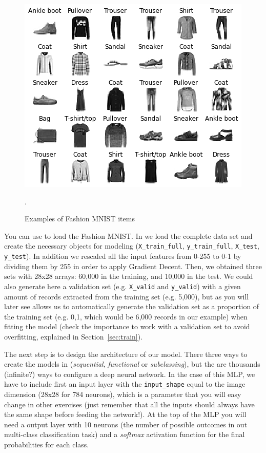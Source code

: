 \begin{figure}
\centering
\includegraphics[width=0.9\linewidth]{figures/ch15_fashion.png}
\caption{Examples of Fashion MNIST items}.
\label{fig:fashion}
\end{figure}

You can use  to load the Fashion MNIST. In  we load the complete data set and create the necessary objects for modeling (\texttt{X\_train\_full}, \texttt{y\_train\_full}, \texttt{X\_test}, \texttt{y\_test}). In addition we rescaled all the input features from 0-255 to 0-1 by dividing them by 255 in order to apply Gradient Decent. Then, we obtained three sets with 28x28 arrays: 60,000 in the training, and 10,000 in the test. We could also generate here a validation set (e.g. \texttt{X\_valid} and \texttt{y\_valid}) with a given amount of records extracted from the training set (e.g. 5,000), but as you will later see   allows us to automatically generate the validation set as a proportion of the training set (e.g. 0,1, which would be 6,000 records in our example) when fitting the model (check the importance to work with a validation set to avoid overfitting, explained in Section~\ref{sec:train}).


The next step is to design the architecture of our model. There three ways to create the models in  (\textit{sequential}, \textit{functional} or \textit{subclassing}), but the are thousands (infinite?) ways to configure a deep neural network. In the case of this MLP, we have to include first an input layer with the \texttt{input\_shape} equal to the image dimension (28x28 for 784 neurons), which is a parameter that you will easy change in other exercises (just remember that all the inputs should always have the same shape before feeding the network!). At the top of the MLP you will  need a output layer with 10 neurons (the number of possible outcomes in out multi-class classification task) and a \textit{softmax} activation function for the final probabilities for each class.

